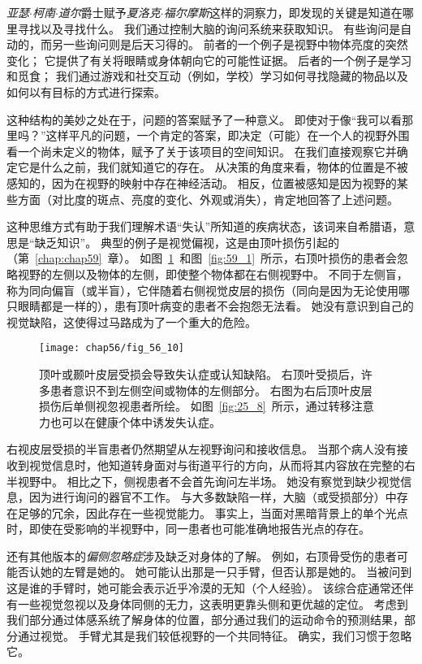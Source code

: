 \textit{亚瑟$\cdot$柯南$\cdot$道尔}爵士赋予\textit{夏洛克$\cdot$福尔摩斯}这样的洞察力，即发现的关键是知道在哪里寻找以及寻找什么。
我们通过控制大脑的询问系统来获取知识。
有些询问是自动的，而另一些询问则是后天习得的。
前者的一个例子是视野中物体亮度的突然变化；
它提供了有关将眼睛或身体朝向它的可能性证据。
后者的一个例子是学习和觅食；
我们通过游戏和社交互动（例如，学校）学习如何寻找隐藏的物品以及如何以有目标的方式进行探索。


这种结构的美妙之处在于，问题的答案赋予了一种意义。
即使对于像“我可以看那里吗？”这样平凡的问题，一个肯定的答案，即决定（可能）在一个人的视野外围看一个尚未定义的物体，赋予了关于该项目的空间知识。
在我们直接观察它并确定它是什么之前，我们就知道它的存在。
从决策的角度来看，物体的位置是不被感知的，因为在视野的映射中存在神经活动。
相反，位置被感知是因为视野的某些方面（对比度的斑点、亮度的变化、外观或消失），肯定地回答了上述问题。


这种思维方式有助于我们理解术语“失认”所知道的疾病状态，该词来自希腊语，意思是“缺乏知识”。
典型的例子是视觉偏视，这是由顶叶损伤引起的（第~\ref{chap:chap59}~章）。
如图~\ref{fig:56_10}~和图~\ref{fig:59_1}~所示，右顶叶损伤的患者会忽略视野的左侧以及物体的左侧，即使整个物体都在右侧视野中。
不同于左侧盲，称为同向偏盲（或半盲），它伴随着右侧视觉皮层的损伤（同向是因为无论使用哪只眼睛都是一样的），患有顶叶病变的患者不会抱怨无法看。
她没有意识到自己的视觉缺陷，这使得过马路成为了一个重大的危险。


\begin{figure}[htbp]
	\centering
	\texttt{[image: chap56/fig\_56\_10]}
	\caption{顶叶或颞叶皮层受损会导致失认症或认知缺陷。
		右顶叶受损后，许多患者意识不到左侧空间或物体的左侧部分。
		右图为右后顶叶皮层损伤后单侧视忽视患者所绘。
		如图~\ref{fig:25_8}~所示，通过转移注意力也可以在健康个体中诱发失认症。}
	\label{fig:56_10}
\end{figure}


右视皮层受损的半盲患者仍然期望从左视野询问和接收信息。
当那个病人没有接收到视觉信息时，他知道转身面对与街道平行的方向，从而将其内容放在完整的右半视野中。
相比之下，侧视患者不会首先询问左半场。
她没有察觉到缺少视觉信息，因为进行询问的器官不工作。
与大多数缺陷一样，大脑（或受损部分）中存在足够的冗余，因此存在一些视觉能力。
事实上，当面对黑暗背景上的单个光点时，即使在受影响的半视野中，同一患者也可能准确地报告光点的存在。


还有其他版本的\textit{偏侧忽略症}涉及缺乏对身体的了解。
例如，右顶骨受伤的患者可能否认她的左臂是她的。
她可能认出那是一只手臂，但否认那是她的。
当被问到这是谁的手臂时，她可能会表示近乎冷漠的无知（个人经验）。
该综合症通常还伴有一些视觉忽视以及身体同侧的无力，这表明更靠头侧和更优越的定位。
考虑到我们部分通过体感系统了解身体的位置，部分通过我们的运动命令的预测结果，部分通过视觉。
手臂尤其是我们较低视野的一个共同特征。
确实，我们习惯于忽略它。


